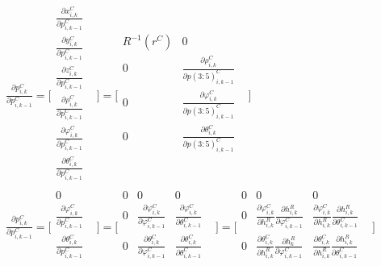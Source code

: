 $\frac{\partial p_{i,k}^{C}}{\partial p_{i,k-1}^{C}}=\lbrack 
\begin{matrix}
\frac{\partial x_{i,k}^{C}}{\partial p_{i,k-1}^{C}} & \\
\frac{\partial y_{i,k}^{C}}{\partial p_{i,k-1}^{C}} & \\
\frac{\partial z_{i,k}^{C}}{\partial p_{i,k-1}^{C}} & \\
\frac{\partial \rho _{i,k}^{C}}{\partial p_{i,k-1}^{C}} & \\
\frac{\partial \varphi _{i, k}^{C}}{\partial p_{i,k-1}^{C}} & \\
\frac{\partial \theta _{i, k}^{C}}{\partial p_{i,k-1}^{C}} & \\
\end{matrix}
\rbrack =\lbrack \begin{matrix}
R^{-1}(r^{C}) & 0 & \\
0 & \frac{\partial \rho _{i,k}^{C}}{\partial p(3:5)_{i,k-1}^{C}} & \\
0 & \frac{\partial \varphi _{i, k}^{C}}{\partial p(3:5)_{i,k-1}^{C}} & 
\\
0 & \frac{\partial \theta _{i, k}^{C}}{\partial p(3:5)_{i,k-1}^{C}} & \\
\end{matrix}
\rbrack $\\


$\frac{\partial p_{i,k}^{C}}{\partial p_{i,k-1}^{C}}=\lbrack 
\begin{matrix}
0 & \\
\frac{\partial \varphi _{i, k}^{C}}{\partial p_{i,k-1}^{C}} & \\
\frac{\partial \theta _{i, k}^{C}}{\partial p_{i,k-1}^{C}} & \\
\end{matrix}
\rbrack =\lbrack \begin{matrix}
0 & 0 & 0 & \\
0 & \frac{\partial \varphi _{i, k}^{C}}{\partial \varphi _{i, k-1}^{C}} 
& \frac{\partial \varphi _{i, k}^{C}}{\partial \theta _{i, k-1}^{C}} & 
\\
0 & \frac{\partial \theta _{i, k}^{C}}{\partial \varphi _{i, k-1}^{C}} & 
\frac{\partial \theta _{i, k}^{C}}{\partial \theta _{i, k-1}^{C}} & \\
\end{matrix}
\rbrack =\lbrack \begin{matrix}
0 & 0 & 0 & \\
0 & \frac{\partial \varphi _{i, k}^{C}}{\partial h_{i,k}^{R}} 
\frac{\partial h_{i,k}^{R}}{\partial \varphi _{i, k-1}^{C}} & 
\frac{\partial \varphi _{i, k}^{C}}{\partial h_{i,k}^{R}} \frac{\partial 
h_{i,k}^{R}}{\partial \theta _{i, k-1}^{C}} & \\
0 & \frac{\partial \theta _{i, k}^{C}}{\partial h_{i,k}^{R}} 
\frac{\partial h_{k}^{R}}{\partial \varphi _{i, k-1}^{C}} & 
\frac{\partial \theta _{i, k}^{C}}{\partial h_{i,k}^{R}} \frac{\partial 
h_{i,k}^{R}}{\partial \theta _{i, k-1}^{C}} & \\
\end{matrix}
\rbrack $\\


